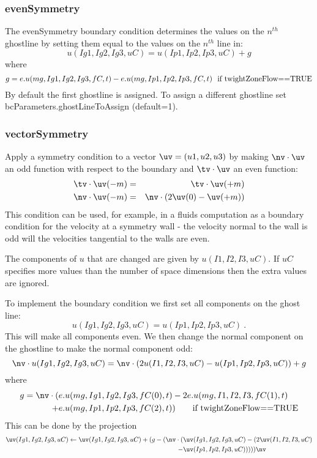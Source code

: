 \subsubsection{evenSymmetry}
The evenSymmetry boundary condition determines the values on the $n^{th}$
ghostline by setting them equal to the values on the $n^{th}$ line in:
\[
u(Ig1,Ig2,Ig3,uC) = u(Ip1,Ip2,Ip3,uC) + g 
\]
where
\[
g =
     e. u(mg,Ig1,Ig2,Ig3,fC,t) - e. u(mg,Ip1,Ip2,Ip3,fC,t) ~~ \mbox{if twightZoneFlow==TRUE} 
\]
By default the first ghostline is assigned. To assign a different ghostline
set {\ff bcParameters.ghostLineToAssign} (default=1).


\subsubsection{vectorSymmetry}

Apply a symmetry condition to a vector $\uv=(u1,u2,u3)$ by making $\nv\cdot\uv$ an odd 
function with respect to the boundary and 
$\tv\cdot\uv$ an even function:
\begin{eqnarray*}
    \tv\cdot\uv(-m) &=& \tv\cdot\uv(+m)  \\
   \nv\cdot\uv(-m) &=& \nv\cdot(2\uv(0)-\uv(+m))  
\end{eqnarray*}
This condition can be used, for example, in a fluids computation 
as a boundary condition for the velocity at a symmetry wall - the velocity normal
to the wall is odd will the velocities tangential to the walls are even.

The components of $u$ that are changed are given by $u(I1,I2,I3,uC)$.
If $uC$ specifies more values than the number of space dimensions then the extra values are
ignored. 

To implement the boundary condition we first set all components on the ghost line:
\[
u(Ig1,Ig2,Ig3,uC) = u(Ip1,Ip2,Ip3,uC)   ~.
\]
This will make all components even. We then change the normal component on the 
ghostline to make the normal component odd:
\[
 \nv\cdot u(Ig1,Ig2,Ig3,uC) = \nv\cdot (2u(I1,I2,I3,uC) - u(Ip1,Ip2,Ip3,uC)) + g 
\]
where
\begin{align*}
 g =  \nv\cdot ( &\true u(mg,Ig1,Ig2,Ig3,fC(0),t) -2 \true u(mg,I1,I2,I3,fC(1),t) \\
                 +& \true u(mg,Ip1,Ip2,Ip3,fC(2),t))
                     \qquad \mbox{if twightZoneFlow==TRUE} 
\end{align*}
This can be done by the projection
\begin{align*}
        \uv(Ig1,Ig2,Ig3,uC) \leftarrow \uv(Ig1,Ig2,Ig3,uC) 
             + (g-(\nv\cdot( &\uv(Ig1,Ig2,Ig3,uC)-(2\uv(I1,I2,I3,uC) \\
                           - &\uv(Ip1,Ip2,Ip3,uC))))) \nv
\end{align*}



